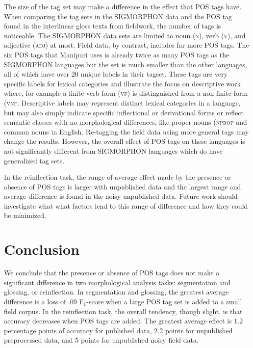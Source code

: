 The size of the tag set may make a difference in the effect that POS tags have. When comparing the tag sets in the SIGMORPHON data and the POS tag found in the interlinear gloss texts from fieldwork, the number of tags is noticeable. The SIGMORPHON data sets are limited to noun (\textsc{n}), verb (\textsc{v}), and adjective (\textsc{adj}) at most. Field data, by contrast, includes far more POS tags. The six POS tags that Manipuri uses is already twice as many POS tags as the SIGMORPHON languages but the set is much smaller than the other languages, all of which have over 20 unique labels in their tagset. These tags are very specific labels for lexical categories and illustrate the focus on descriptive work where, for example a finite verb form (\textsc{vf}) is distinguished from a non-finite form (\textsc{vnf}. Descriptive labels may represent distinct lexical categories in a language, but may also simply indicate specific inflectional or derivational forms or reflect semantic classes with no morphological differences, like proper nouns (\textsc{nprop} and common nouns in English. 
Re-tagging the field data using more general tags may change the results. However, the overall effect of POS tags on these languages is not significantly different from SIGMORPHON languages which do have generalized tag sets.


In the reinflection task, the range of average effect made by the presence or absence of POS tags is larger with unpublished data and the largest range and average difference is found in the noisy unpublished data. Future work should investigate what what factors lend to this range of difference and how they could be minimized. %

\section{Conclusion}

We conclude that the presence or absence of POS tags does not make a significant difference in two morphological analysis tasks: segmentation and glossing, or reinflection. In segmentation and glossing, the greatest average difference is a loss of .09 F$_1$-score when a large POS tag set is added to a small field corpus. In the reinflection task, the overall tendency, though slight, is that accuracy decreases when POS tags are added. The greatest average effect is 1.2 percentage points of accuracy for published data, 2.2 points for unpublished preprocessed data, and 5 points for unpublished noisy field data.

